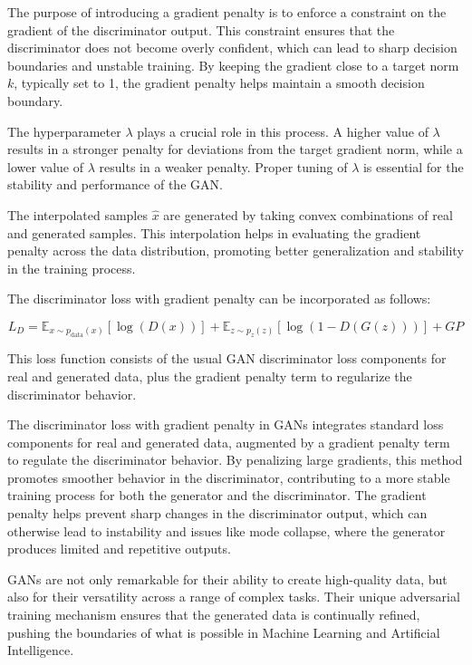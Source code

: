 \documentclass[12pt,a4paper]{report}
\begin{document}
The purpose of introducing a gradient penalty is to enforce a constraint on the gradient of the discriminator output. This constraint ensures that the discriminator does not become overly confident, which can lead to sharp decision boundaries and unstable training. By keeping the gradient close to a target norm \(k\), typically set to 1, the gradient penalty helps maintain a smooth decision boundary.

The hyperparameter \(\lambda\) plays a crucial role in this process. A higher value of \(\lambda\) results in a stronger penalty for deviations from the target gradient norm, while a lower value of \(\lambda\) results in a weaker penalty. Proper tuning of \(\lambda\) is essential for the stability and performance of the GAN.

The interpolated samples \(\hat{x}\) are generated by taking convex combinations of real and generated samples. This interpolation helps in evaluating the gradient penalty across the data distribution, promoting better generalization and stability in the training process.

The discriminator loss with gradient penalty can be incorporated as follows:

\begin{equation}
  L_D = \mathbb{E}_{x \sim p_{\text{data}}(x)} \left[ \log(D(x)) \right] + \mathbb{E}_{z \sim p_z(z)} \left[ \log(1 - D(G(z))) \right] + GP
\end{equation}

This loss function consists of the usual GAN discriminator loss components for real and generated data, plus the gradient penalty term to regularize the discriminator behavior.


The discriminator loss with gradient penalty in GANs integrates standard loss components for real and generated data, augmented by a gradient penalty term to regulate the discriminator behavior. By penalizing large gradients, this method promotes smoother behavior in the discriminator, contributing to a more stable training process for both the generator and the discriminator. The gradient penalty helps prevent sharp changes in the discriminator output, which can otherwise lead to instability and issues like mode collapse, where the generator produces limited and repetitive outputs.

GANs are not only remarkable for their ability to create high-quality data, but also for their versatility across a range of complex tasks. Their unique adversarial training mechanism ensures that the generated data is continually refined, pushing the boundaries of what is possible in Machine Learning and Artificial Intelligence.
\end{document}

